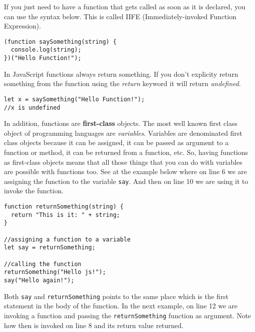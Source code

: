 \documentclass[a4paper, oneside, titlepage, 12pt]{book}
\begin{document}
If you just need to have a function that gets called as soon as it is declared, you can use the syntax below. This is called IIFE (Immediately-invoked Function Expression).

\begin{verbatim}
(function saySomething(string) {
  console.log(string);
})("Hello Function!");
\end{verbatim}

In JavaScript functions always return something. If you don't explicity return something from the function using the \textit{return} keyword it will return \textit{undefined}.

\begin{verbatim}
let x = saySomething("Hello Function!");
//x is undefined
\end{verbatim}

In addition, functions are \textbf{first-class} objects. The most well known first class object of programming languages are \textit{variables}. Variables are denominated first class objects because it can be assigned, it can be passed as argument to a function or method, it can be returned from a function, etc. So, having functions as first-class objects means that all those things that you can do with variables are possible with functions too. See at the example below where on line 6 we are assigning the function to the variable \colorbox{verylight}{\lstinline{say}}. And then on line 10 we are using it to invoke the function.

\begin{verbatim}
function returnSomething(string) {
  return "This is it: " + string;
}

//assigning a function to a variable
let say = returnSomething;

//calling the function
returnSomething("Hello js!");
say("Hello again!");
\end{verbatim}

Both \texttt{say} and \texttt{returnSomething} points to the same place which is the first statement in the body of the function. In the next example, on line 12 we are invoking a function and passing the \texttt{returnSomething} function as argument. Note how then is invoked on line 8 and its return value returned.
\end{document}
